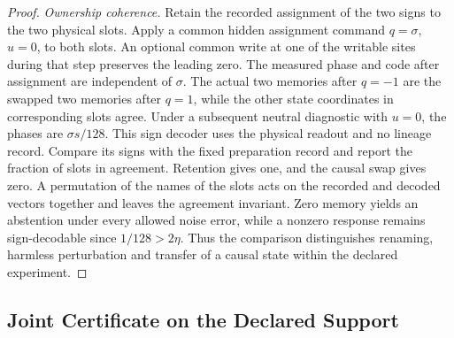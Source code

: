 \documentclass[11pt,a4paper]{article}
\theoremstyle{definition}
\begin{document}
\begin{proof}
\emph{Ownership coherence.} Retain the recorded assignment of the two signs to the two physical slots. Apply a common hidden assignment command $q=\sigma$, $u=0$, to both slots. An optional common write at one of the writable sites during that step preserves the leading zero. The measured phase and code after assignment are independent of $\sigma$. The actual two memories after $q=-1$ are the swapped two memories after $q=1$, while the other state coordinates in corresponding slots agree. Under a subsequent neutral diagnostic with $u=0$, the phases are $\sigma s/128$. This sign decoder uses the physical readout and no lineage record. Compare its signs with the fixed preparation record and report the fraction of slots in agreement. Retention gives one, and the causal swap gives zero. A permutation of the names of the slots acts on the recorded and decoded vectors together and leaves the agreement invariant. Zero memory yields an abstention under every allowed noise error, while a nonzero response remains sign-decodable since $1/128>2\eta$. Thus the comparison distinguishes renaming, harmless perturbation and transfer of a causal state within the declared experiment.
\end{proof}

\subsection{Joint Certificate on the Declared Support}
\end{document}
